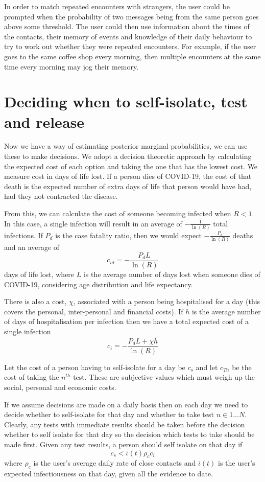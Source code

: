 \documentclass{article}
\begin{document}
In order to match repeated encounters with strangers, the user could be prompted when the probability of two messages being from the same person goes above some threshold. The user could then use information about the times of the contacts, their memory of events and knowledge of their daily behaviour to try to work out whether they were repeated encounters. For example, if the user goes to the same coffee shop every morning, then multiple encounters at the same time every morning may jog their memory.


\section{Deciding when to self-isolate, test and release}
Now we have a way of estimating posterior marginal probabilities, we can use these to make decisions. We adopt a decision theoretic approach by calculating the expected cost of each option and taking the one that has the lowest cost. We measure cost in days of life lost. If a person dies of COVID-19, the cost of that death is the expected number of extra days of life that person would have had, had they not contracted the disease.

From this, we can calculate the cost of someone becoming infected when $R<1$. In this case, a single infection will result in an average of $-\frac{1}{\ln(R)}$ total infections. If $P_d$ is the case fatality ratio, then we would expect $-\frac{P_d}{\ln(R)}$ deaths and an average of
\[
c_{id} = -\frac{P_dL}{\ln(R)}
\]
days of life lost, where $L$ is the average number of days lost when someone dies of COVID-19, considering age distribution and life expectancy.

There is also a cost, $\chi$, associated with a person being hospitalised for a day (this covers the personal, inter-personal and financial costs). If $\bar{h}$ is the average number of days of hospitalisation per infection then we have a total expected cost of a single infection
\[
c_{i} = -\frac{P_dL + \chi\bar{h}}{\ln(R)}
\]

Let the cost of a person having to self-isolate for a day be $c_s$ and let $c_{Tn}$ be the cost of taking the $n^{th}$ test. These are subjective values which must weigh up the social, personal and economic costs.

If we assume decisions are made on a daily basis then on each day we need to decide whether to self-isolate for that day and whether to take test $n \in 1...N$. Clearly, any tests with immediate results should be taken before the decision whether to self isolate for that day so the decision which tests to take should be made first. Given any test results, a person should self isolate on that day if
\[
c_s < \bar{\iota}(t)\rho_cc_i
\]
where $\rho_c$ is the user's average daily rate of close contacts and $\bar{\iota}(t)$ is the user's expected infectiousness on that day, given all the evidence to date.
\end{document}
